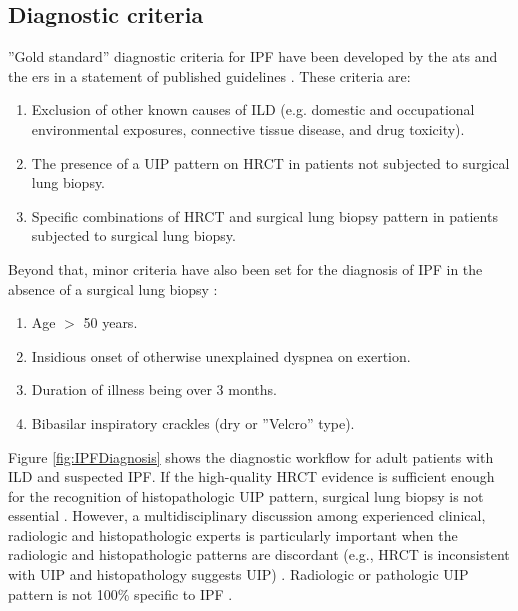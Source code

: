 \subsection{Diagnostic criteria} \label{DiagnosisCriteria}
''Gold standard'' diagnostic criteria for IPF have been developed by the \gls{ats} and the \gls{ers} in a statement of published guidelines \citep{raghu2011official}. These criteria are:
\begin{enumerate}
  \item Exclusion of other known causes of ILD (e.g. domestic and occupational environmental exposures, connective tissue disease, and drug toxicity).
  \item The presence of a UIP pattern on HRCT in patients not subjected to surgical lung biopsy.
  \item Specific combinations of HRCT and surgical lung biopsy pattern in patients subjected to surgical lung biopsy.
\end{enumerate}

Beyond that, minor criteria have also been set for the diagnosis of IPF in the absence of a surgical lung biopsy \citep{raghu2011official}:
\begin{enumerate}
  \item Age $>$ 50 years.
	\item Insidious onset of otherwise unexplained dyspnea on exertion.
	\item Duration of illness being over 3 months.
	\item Bibasilar inspiratory crackles (dry or ''Velcro'' type).
\end{enumerate}

Figure \ref{fig:IPFDiagnosis} shows the diagnostic workflow for adult patients with ILD and suspected IPF. If the high-quality HRCT evidence is sufficient enough for the recognition of histopathologic UIP pattern, surgical lung biopsy is not essential \citep{hunninghake2001utility, raghu1999accuracy, flaherty2003radiological, quadrelli2010radiological}. However, a multidisciplinary discussion among experienced clinical, radiologic and histopathologic experts is particularly important when the radiologic and histopathologic patterns are discordant (e.g., HRCT is inconsistent with UIP and histopathology suggests UIP) \citep{raghu2011official}. Radiologic or pathologic UIP pattern is not 100\% specific to IPF \citep{lynch2006usual, trahan2008role, silva2008chronic}.

